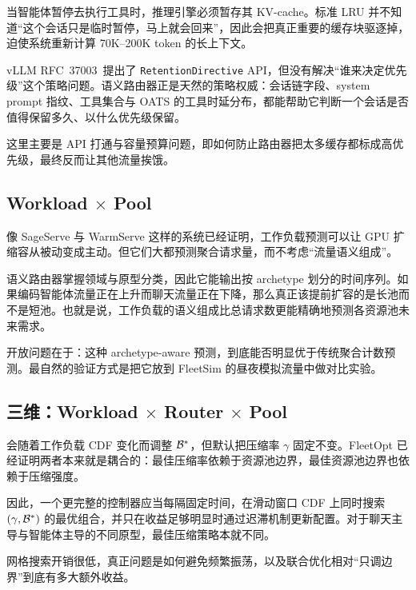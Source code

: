\begin{opportunity}
\label{opp:kv-retention}
当智能体暂停去执行工具时，推理引擎必须暂存其 KV-cache。标准 LRU 并不知道“这个会话只是临时暂停，马上就会回来”，因此会把真正重要的缓存块驱逐掉，迫使系统重新计算 70K--200K token 的长上下文。

vLLM RFC~37003~\cite{vllm2026rfc37003}提出了 \texttt{RetentionDirective} API，但没有解决“谁来决定优先级”这个策略问题。语义路由器正是天然的策略权威：会话链字段、system prompt 指纹、工具集合与 OATS 的工具时延分布，都能帮助它判断一个会话是否值得保留多久、以什么优先级保留。

\begin{frisk}
这里主要是 API 打通与容量预算问题，即如何防止路由器把太多缓存都标成高优先级，最终反而让其他流量挨饿。
\end{frisk}
\end{opportunity}

\subsection{Workload $\times$ Pool}

\begin{opportunity}[由原型驱动的主动资源池扩缩容]
\label{opp:proactive-scaling}
像 SageServe 与 WarmServe 这样的系统已经证明，工作负载预测可以让 GPU 扩缩容从被动变成主动。但它们大都预测聚合请求量，而不考虑“流量语义组成”。

语义路由器掌握领域与原型分类，因此它能输出按 archetype 划分的时间序列。如果编码智能体流量正在上升而聊天流量正在下降，那么真正该提前扩容的是长池而不是短池。也就是说，工作负载的语义组成比总请求数更能精确地预测各资源池未来需求。

\begin{frisk}
开放问题在于：这种 archetype-aware 预测，到底能否明显优于传统聚合计数预测。最自然的验证方式是把它放到 FleetSim 的昼夜模拟流量中做对比实验。
\end{frisk}
\end{opportunity}

\subsection{三维：Workload $\times$ Router $\times$ Pool}

\begin{opportunity}[压缩率与资源池边界的在线联合自适应]
\label{opp:workload-shaping}
 会随着工作负载 CDF 变化而调整 $\mathcal{B}^*$，但默认把压缩率 $\gamma$ 固定不变。FleetOpt 已经证明两者本来就是耦合的：最佳压缩率依赖于资源池边界，最佳资源池边界也依赖于压缩强度。

因此，一个更完整的控制器应当每隔固定时间，在滑动窗口 CDF 上同时搜索 $(\gamma, \mathcal{B}^*)$ 的最优组合，并只在收益足够明显时通过迟滞机制更新配置。对于聊天主导与智能体主导的不同原型，最佳压缩策略本就不同。

\begin{frisk}
网格搜索开销很低，真正问题是如何避免频繁振荡，以及联合优化相对“只调边界”到底有多大额外收益。
\end{frisk}
\end{opportunity}


